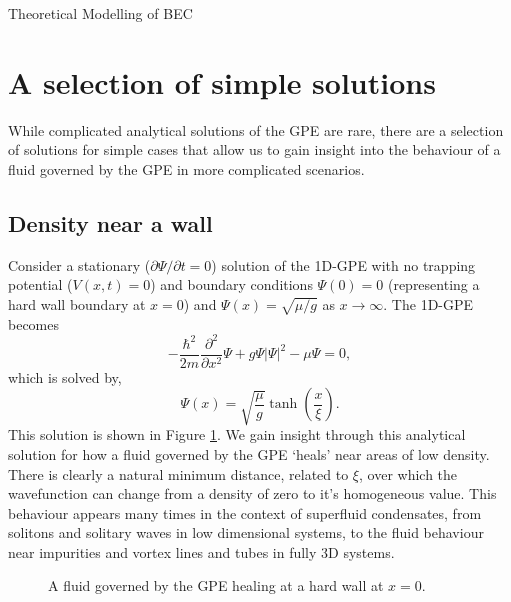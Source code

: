 \begin{chapter}{\label{cha:theoretical_model}Theoretical Modelling of BEC}
\section{\label{section:solutions} A selection of simple solutions}
	While complicated analytical solutions of the GPE are rare, there are a selection of solutions for simple cases that allow us to gain insight into the behaviour of a fluid governed by the GPE in more complicated scenarios.
	\subsection{\label{section:wall} Density near a wall}
	Consider a stationary ($\partial \Psi / \partial t = 0$) solution of the 1D-GPE with no trapping potential ($V(x,t)=0$) and boundary conditions $\Psi(0)=0$ (representing a hard wall boundary at $x=0$) and $\Psi(x)=\sqrt{\mu/g}$ as $x\rightarrow\infty$. The 1D-GPE becomes
	\begin{equation}
		-\frac{\hbar^2 }{2m}\frac{\partial^2}{\partial x^2}\Psi + g\Psi|\Psi|^2 - \mu\Psi = 0,
	\end{equation}
	which is solved by,
	\begin{equation}
		\Psi(x) = \sqrt{\frac{\mu}{g}}\tanh \left( \frac{x}{\xi} \right).
	\end{equation}
	This solution is shown in Figure \ref{fig_wallsoln}. We gain insight through this analytical solution for how a fluid governed by the GPE `heals' near areas of low density. There is clearly a natural minimum distance, related to $\xi$, over which the wavefunction can change from a density of zero to it's homogeneous value. This behaviour appears many times in the context of superfluid condensates, from solitons and solitary waves in low dimensional systems, to the fluid behaviour near impurities and vortex lines and tubes in fully 3D systems. 
\begin{figure}
	\centering
  \caption{A fluid governed by the GPE healing at a hard wall at $x=0$.}\label{fig_wallsoln}
 \end{figure}


\end{chapter}
